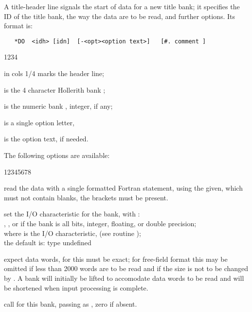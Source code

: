 A title-header line signals the start of data for a new title bank;
it specifies the ID of the title bank,
the way the data are to be read, and further options.
Its format is:

\begin{verbatim}
   *DO  <idh> [idn]  [-<opt><option text>]   [#. comment ]
\end{verbatim}

\begin{DLtt}{1234}
\item[*DO]   in cols 1/4 marks the header line;
\item[<idh>] is the 4 character Hollerith bank ;
\item[<idn>] is the numeric bank , integer, if any;
\item[<opt>] is a single option letter,
\item[<otx>] is the option text, if needed.
\end{DLtt}

The following options are available:

\begin{DLtt}{12345678}
\item[-F(format)]  read the data with a single formatted Fortran
                statement, using the  given, which must
               not contain blanks, the brackets must be present.
\item[-Itext]  set the I/O characteristic for the bank, with :\\
               , ,  or  if the bank is all bits, integer,
               floating, or double precision;\\
                where  is the I/O characteristic,
               (see routine );\\
               the default is: type undefined
\item[-Nn] expect  data words, for  this must be exact; for free-field
               format this may be omitted if less than 2000 words are to be
               read and if the size is not to be changed by .
               A bank will initially be lifted to accomodate  data words to
               be read and will be shortened when input processing is complete.
\item[-U\lsb{}n\rsb] call  for this bank, passing  as , 
               zero if absent.
\end{DLtt}

